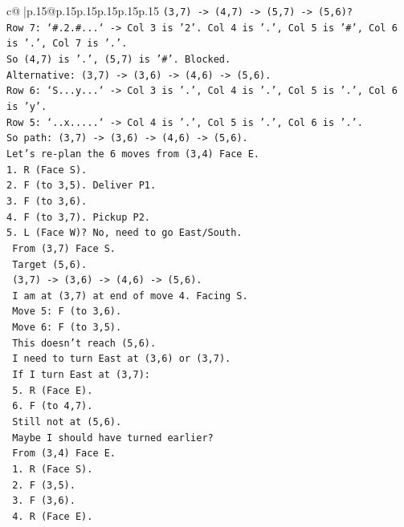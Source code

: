 \documentclass{article}
\begin{document}
{\begin{supertabular}{c@{$\;$}|p{.15\linewidth}@{}p{.15\linewidth}p{.15\linewidth}p{.15\linewidth}p{.15\linewidth}p{.15\linewidth}}
{{{\texttt{(3,7) {-}> (4,7) {-}> (5,7) {-}> (5,6)?} \\
\texttt{Row 7: `\#.2.\#...` {-}> Col 3 is '2'. Col 4 is '.', Col 5 is '\#', Col 6 is '.', Col 7 is '.'.} \\
\texttt{So (4,7) is '.', (5,7) is '\#'. Blocked.} \\
\texttt{Alternative: (3,7) {-}> (3,6) {-}> (4,6) {-}> (5,6).} \\
\texttt{Row 6: `S...y...` {-}> Col 3 is '.', Col 4 is '.', Col 5 is '.', Col 6 is 'y'.} \\
\texttt{Row 5: `..x.....` {-}> Col 4 is '.', Col 5 is '.', Col 6 is '.'.} \\
\texttt{So path: (3,7) {-}> (3,6) {-}> (4,6) {-}> (5,6).} \\
\texttt{Let's re{-}plan the 6 moves from (3,4) Face E.} \\
\texttt{1. R (Face S).} \\
\texttt{2. F (to 3,5). Deliver P1.} \\
\texttt{3. F (to 3,6).} \\
\texttt{4. F (to 3,7). Pickup P2.} \\
\texttt{5. L (Face W)? No, need to go East/South.} \\
\texttt{   From (3,7) Face S.} \\
\texttt{   Target (5,6).} \\
\texttt{   (3,7) {-}> (3,6) {-}> (4,6) {-}> (5,6).} \\
\texttt{   I am at (3,7) at end of move 4. Facing S.} \\
\texttt{   Move 5: F (to 3,6).} \\
\texttt{   Move 6: F (to 3,5).} \\
\texttt{   This doesn't reach (5,6).} \\
\texttt{   I need to turn East at (3,6) or (3,7).} \\
\texttt{   If I turn East at (3,7):} \\
\texttt{   5. R (Face E).} \\
\texttt{   6. F (to 4,7).} \\
\texttt{   Still not at (5,6).} \\
\texttt{   Maybe I should have turned earlier?} \\
\texttt{   From (3,4) Face E.} \\
\texttt{   1. R (Face S).} \\
\texttt{   2. F (3,5).} \\
\texttt{   3. F (3,6).} \\
\texttt{   4. R (Face E).} \\
}}}
\end{supertabular}}
\end{document}

